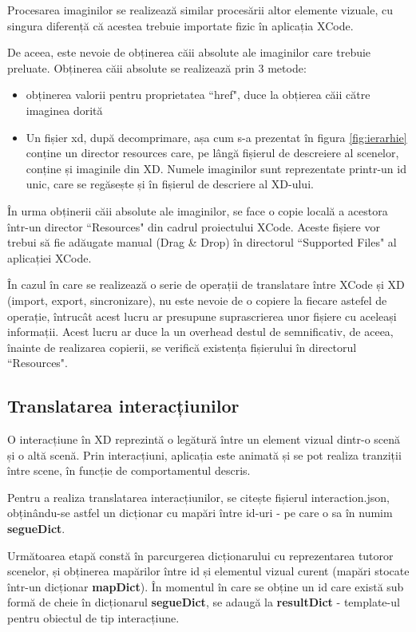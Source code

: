 Procesarea imaginilor se realizează similar procesării altor elemente vizuale, cu singura diferență că acestea trebuie importate fizic în aplicația XCode.

De aceea, este nevoie de obținerea căii absolute ale imaginilor care trebuie preluate. 
Obținerea căii absolute se realizează prin 3 metode:

\begin{itemize}  
\item obținerea valorii pentru proprietatea ``href", duce la obțierea căii către imaginea dorită
\item Un fișier xd, după decomprimare, așa cum s-a prezentat în figura \ref{fig:ierarhie} conține un director resources care, pe lângă fișierul de descreiere al scenelor, conține și imaginile din XD. Numele imaginilor sunt reprezentate printr-un id unic, care se regăsește și în fișierul de descriere al XD-ului.
\end{itemize}

În urma obținerii căii absolute ale imaginilor, se face o copie locală a acestora într-un director ``Resources" din cadrul proiectului XCode. Aceste fișiere vor trebui să fie adăugate manual (Drag & Drop) în directorul ``Supported Files" al aplicației XCode.

În cazul în care se realizează o serie de operații de translatare între XCode și XD (import, export, sincronizare), nu este nevoie de o copiere la fiecare astefel de operație, întrucât acest lucru ar presupune suprascrierea unor fișiere cu aceleași informații. Acest lucru ar duce la un overhead destul de semnificativ, de aceea, înainte de realizarea copierii, se verifică existența fișierului în directorul ``Resources".

\subsection{Translatarea interacțiunilor}

O interacțiune în XD reprezintă o legătură între un element vizual dintr-o scenă și o altă scenă. Prin interacțiuni, aplicația este animată și se pot realiza tranziții între scene, în funcție de comportamentul descris. 

Pentru a realiza translatarea interacțiunilor, se citește fișierul interaction.json, obținându-se astfel un dicționar cu mapări între id-uri - pe care o sa în numim \textbf{segueDict}. 

Următoarea etapă constă în parcurgerea dicționarului cu reprezentarea tutoror scenelor, și obținerea mapărilor între id și elementul vizual curent (mapări stocate într-un dicționar \textbf{mapDict}). În momentul în care se obține un id care există sub formă de cheie în dicționarul \textbf{segueDict}, se adaugă la \textbf{resultDict} - template-ul pentru obiectul de tip interacțiune. 

